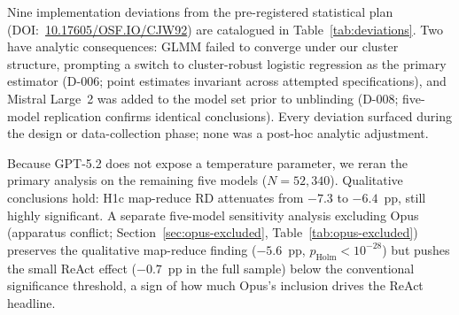 Nine implementation deviations from the pre-registered statistical plan (DOI:~\href{https://doi.org/10.17605/OSF.IO/CJW92}{10.17605/OSF.IO/CJW92}) are catalogued in Table~\ref{tab:deviations}.  Two have analytic consequences: GLMM failed to converge under our cluster structure, prompting a switch to cluster-robust logistic regression as the primary estimator (D-006; point estimates invariant across attempted specifications), and Mistral Large~2 was added to the model set prior to unblinding (D-008; five-model replication confirms identical conclusions).  Every deviation surfaced during the design or data-collection phase; none was a post-hoc analytic adjustment.

Because GPT-5.2 does not expose a temperature parameter, we reran the primary analysis on the remaining five models ($N = 52{,}340$).  Qualitative conclusions hold: H1c map-reduce RD attenuates from $-7.3$ to $-6.4$~pp, still highly significant.  A separate five-model sensitivity analysis excluding Opus (apparatus conflict; Section~\ref{sec:opus-excluded}, Table~\ref{tab:opus-excluded}) preserves the qualitative map-reduce finding ($-5.6$~pp, $p_{\text{Holm}} < 10^{-28}$) but pushes the small ReAct effect ($-0.7$~pp in the full sample) below the conventional significance threshold, a sign of how much Opus's inclusion drives the ReAct headline.

